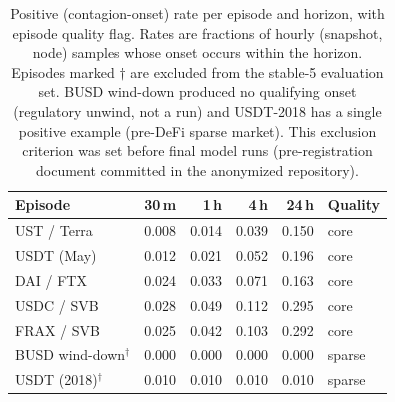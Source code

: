 \documentclass[sigconf,anonymous]{acmart}
\begin{document}
\begin{table}[t]
\caption{Positive (contagion-onset) rate per episode and horizon, with episode quality flag.
Rates are fractions of hourly (snapshot, node) samples whose onset occurs within the horizon.
Episodes marked $\dagger$ are excluded from the stable-5 evaluation set. BUSD wind-down produced
no qualifying onset (regulatory unwind, not a run) and USDT-2018 has a single positive example
(pre-DeFi sparse market). This exclusion criterion was set before final model runs
(pre-registration document committed in the anonymized repository).}
\label{tab:baserates}
\small
\begin{tabular}{lrrrrl}
\toprule
Episode & 30\,m & 1\,h & 4\,h & 24\,h & Quality \\
\midrule
UST / Terra & 0.008 & 0.014 & 0.039 & 0.150 & core \\
USDT (May) & 0.012 & 0.021 & 0.052 & 0.196 & core \\
DAI / FTX & 0.024 & 0.033 & 0.071 & 0.163 & core \\
USDC / SVB & 0.028 & 0.049 & 0.112 & 0.295 & core \\
FRAX / SVB & 0.025 & 0.042 & 0.103 & 0.292 & core \\
BUSD wind-down$^\dagger$ & 0.000 & 0.000 & 0.000 & 0.000 & sparse \\
USDT (2018)$^\dagger$ & 0.010 & 0.010 & 0.010 & 0.010 & sparse \\
\bottomrule
\end{tabular}
\end{table}
\end{document}
